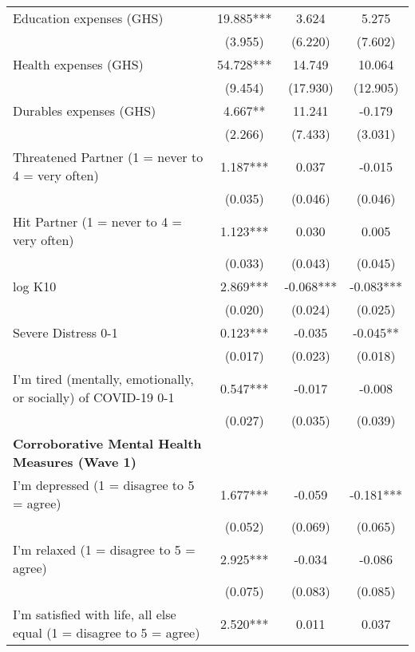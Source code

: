 \begin{ThreePartTable}
\begin{table}[tbp]
\begin{tabular}{lccc}
 Education expenses (GHS) & 19.885*** & 3.624 & 5.275 \\ [0.1em] 
                   &      (3.955)     &      (6.220)     &      (7.602)     \\ [0.1em] 
 Health expenses (GHS) & 54.728*** & 14.749 & 10.064 \\ [0.1em] 
                   &      (9.454)     &      (17.930)     &      (12.905)     \\ [0.1em] 
 Durables expenses (GHS) & 4.667** & 11.241 & -0.179 \\ [0.1em] 
                   &      (2.266)     &      (7.433)     &      (3.031)     \\ [0.1em] 
 Threatened Partner (1 = never to 4 = very often) & 1.187*** & 0.037 & -0.015 \\ [0.1em] 
                   &      (0.035)     &      (0.046)     &      (0.046)     \\ [0.1em] 
 Hit Partner (1 = never to 4 = very often) & 1.123*** & 0.030 & 0.005 \\ [0.1em] 
                   &      (0.033)     &      (0.043)     &      (0.045)     \\ [0.1em] 
 log K10 & 2.869*** & -0.068*** & -0.083*** \\ [0.1em] 
                   &      (0.020)     &      (0.024)     &      (0.025)     \\ [0.1em] 
 Severe Distress 0-1 & 0.123*** & -0.035 & -0.045** \\ [0.1em] 
                   &      (0.017)     &      (0.023)     &      (0.018)     \\ [0.1em] 
 I'm tired (mentally, emotionally, or socially) of COVID-19 0-1 & 0.547*** & -0.017 & -0.008 \\ [0.1em] 
                   &      (0.027)     &      (0.035)     &      (0.039)     \\ [0.1em] 
\textbf{Corroborative Mental Health Measures (Wave 1)} & & & \\ 
 I'm depressed (1 = disagree to 5 = agree) & 1.677*** & -0.059 & -0.181*** \\ [0.1em] 
                   &      (0.052)     &      (0.069)     &      (0.065)     \\ [0.1em] 
 I'm relaxed (1 = disagree to 5 = agree) & 2.925*** & -0.034 & -0.086 \\ [0.1em] 
                   &      (0.075)     &      (0.083)     &      (0.085)     \\ [0.1em] 
 I'm satisfied with life, all else equal (1 = disagree to 5 = agree) & 2.520*** & 0.011 & 0.037 \\ [0.1em] 

\end{tabular}
\end{table}
\end{ThreePartTable}
